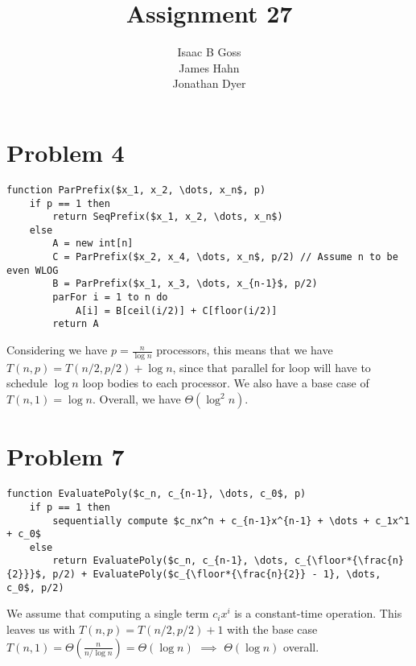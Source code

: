 \documentclass{article}
\author{Isaac B Goss\\ James Hahn\\ Jonathan Dyer}
\title{Assignment 27}
\providecommand{\prob}[1]{\section*{Problem #1}}
\DeclarePairedDelimiter\floor{\lfloor}{\rfloor}
\begin{document}
\maketitle

\prob{4}

\begin{lstlisting}
function ParPrefix($x_1, x_2, \dots, x_n$, p)
    if p == 1 then
        return SeqPrefix($x_1, x_2, \dots, x_n$)
    else
        A = new int[n]
        C = ParPrefix($x_2, x_4, \dots, x_n$, p/2) // Assume n to be even WLOG
        B = ParPrefix($x_1, x_3, \dots, x_{n-1}$, p/2)
        parFor i = 1 to n do
            A[i] = B[ceil(i/2)] + C[floor(i/2)]
        return A
\end{lstlisting}

Considering we have $p = \frac{n}{\log n}$ processors, this means that we have $T(n, p) = T(n/2, p/2) + \log n$, since that parallel for loop will have to schedule $\log n$ loop bodies to each processor.
We also have a base case of $T(n, 1) = \log n$.
Overall, we have $\Theta(\log^2 n)$.

\prob{7}
    \begin{lstlisting}
function EvaluatePoly($c_n, c_{n-1}, \dots, c_0$, p)
    if p == 1 then
        sequentially compute $c_nx^n + c_{n-1}x^{n-1} + \dots + c_1x^1 + c_0$
    else
        return EvaluatePoly($c_n, c_{n-1}, \dots, c_{\floor*{\frac{n}{2}}}$, p/2) + EvaluatePoly($c_{\floor*{\frac{n}{2}} - 1}, \dots, c_0$, p/2)
    \end{lstlisting}

    We assume that computing a single term $c_ix^i$ is a constant-time operation.
    This leaves us with $T(n, p) = T(n/2, p/2) + 1$ with the base case $T(n, 1) = \Theta(\frac{n}{n/\log n}) = \Theta(\log n)$ $\implies$ $\Theta(\log n)$ overall.
\end{document}
